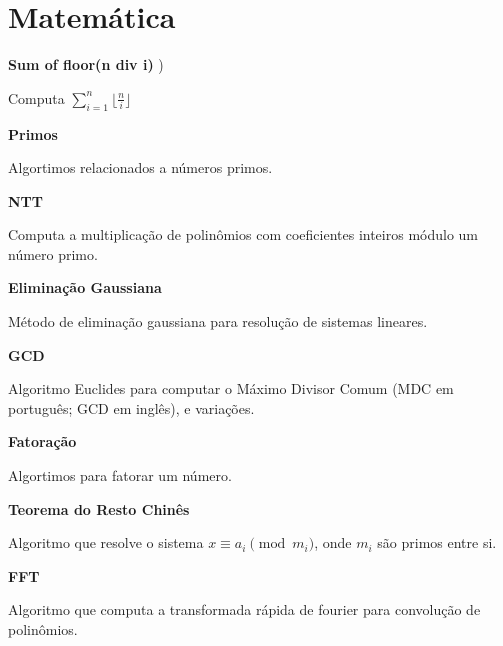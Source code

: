 \documentclass[11pt, a4paper, twoside]{book}
\begin{document}
%
%
%
%

\chapter{Matemática}



\textbf{Sum of floor(n div i)} )



Computa $\sum_{i=1}^{n} \lfloor\frac{n}{i}\rfloor $





\textbf{Primos} 



Algortimos relacionados a números primos.





\textbf{NTT} 



Computa a multiplicação de polinômios com coeficientes inteiros módulo um número primo.





\textbf{Eliminação Gaussiana} 



Método de eliminação gaussiana para resolução de sistemas lineares.





\textbf{GCD} 



Algoritmo Euclides para computar o Máximo Divisor Comum (MDC em português; GCD em inglês), e variações.





\textbf{Fatoração} 



Algortimos para fatorar um número.





\textbf{Teorema do Resto Chinês} 



Algoritmo que resolve o sistema $x \equiv a_i \pmod{m_i}$, onde $m_i$ são primos entre si.





\textbf{FFT} 



Algoritmo que computa a transformada rápida de fourier para convolução de polinômios.
\end{document}
